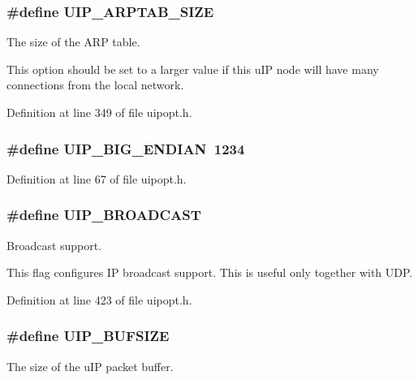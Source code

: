 \hypertarget{group__uipopt_gab1455b27c06532a399cf06d2c1d6d08d}{
\subsubsection[{UIP\_\-ARPTAB\_\-SIZE}]{\setlength{\rightskip}{0pt plus 5cm}\#define UIP\_\-ARPTAB\_\-SIZE}}
\label{group__uipopt_gab1455b27c06532a399cf06d2c1d6d08d}
The size of the ARP table.

This option should be set to a larger value if this uIP node will have many connections from the local network. 

Definition at line 349 of file uipopt.h.

\hypertarget{group__uipopt_ga6836f92f3692f3a4429eb599db40cbae}{
\subsubsection[{UIP\_\-BIG\_\-ENDIAN}]{\setlength{\rightskip}{0pt plus 5cm}\#define UIP\_\-BIG\_\-ENDIAN~1234}}
\label{group__uipopt_ga6836f92f3692f3a4429eb599db40cbae}


Definition at line 67 of file uipopt.h.

\hypertarget{group__uipopt_ga156dd2891a57035e4afdc4c2bc0b0ebf}{
\subsubsection[{UIP\_\-BROADCAST}]{\setlength{\rightskip}{0pt plus 5cm}\#define UIP\_\-BROADCAST}}
\label{group__uipopt_ga156dd2891a57035e4afdc4c2bc0b0ebf}
Broadcast support.

This flag configures IP broadcast support. This is useful only together with UDP. 

Definition at line 423 of file uipopt.h.

\hypertarget{group__uipopt_ga3589822ecb9d9c4145209756396b8a6b}{
\subsubsection[{UIP\_\-BUFSIZE}]{\setlength{\rightskip}{0pt plus 5cm}\#define UIP\_\-BUFSIZE}}
\label{group__uipopt_ga3589822ecb9d9c4145209756396b8a6b}
The size of the uIP packet buffer.

